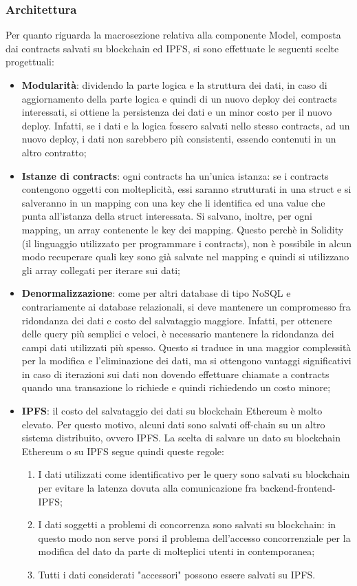 \subsubsection{Architettura}
		Per quanto riguarda la macrosezione relativa alla componente Model, composta dai contracts salvati su blockchain ed IPFS, si sono effettuate le seguenti scelte progettuali:
		\begin{itemize}
			\item \textbf{Modularità}: dividendo la parte logica e la struttura dei dati, in caso di aggiornamento della parte logica e quindi di un nuovo deploy dei contracts interessati, si ottiene la persistenza dei dati e un minor costo per il nuovo deploy. Infatti, se i dati e la logica fossero salvati nello stesso contracts, ad un nuovo deploy, i dati non sarebbero più consistenti, essendo contenuti in un altro contratto;
			\item \textbf{Istanze di contracts}: ogni contracts ha un'unica istanza: se i contracts contengono oggetti con molteplicità, essi saranno strutturati in una struct e si salveranno in un mapping con una key che li identifica ed una value che punta all'istanza della struct interessata. Si salvano, inoltre, per ogni mapping, un array contenente le key dei mapping. Questo perchè in Solidity (il linguaggio utilizzato per programmare i contracts), non è possibile in alcun modo recuperare quali key sono già salvate nel mapping e quindi si utilizzano gli array collegati per iterare sui dati;
			\item \textbf{Denormalizzazione}: come per altri database di tipo NoSQL e contrariamente ai database relazionali, si deve mantenere un compromesso fra ridondanza dei dati e costo del salvataggio maggiore. Infatti, per ottenere delle query più semplici e veloci, è necessario mantenere la ridondanza dei campi dati utilizzati più spesso. Questo si traduce in una maggior complessità per la modifica e l'eliminazione dei dati, ma si ottengono vantaggi significativi in caso di iterazioni sui dati non dovendo effettuare chiamate a contracts quando una transazione lo richiede e quindi richiedendo un costo minore;
			\item \textbf{IPFS}: il costo del salvataggio dei dati su blockchain Ethereum è molto elevato. Per questo motivo, alcuni dati sono salvati off-chain su un altro sistema distribuito, ovvero IPFS. La scelta di salvare un dato su blockchain Ethereum o su IPFS segue quindi queste regole:
			\begin{enumerate}
				\item I dati utilizzati come identificativo per le query sono salvati su blockchain
				per evitare la latenza dovuta alla comunicazione fra backend-frontend-IPFS;
				\item I dati soggetti a problemi di concorrenza sono salvati su blockchain: in questo modo
				non serve porsi il problema dell'accesso concorrenziale per la modifica del dato da parte
				di molteplici utenti in contemporanea;
				\item Tutti i dati considerati "accessori" possono essere salvati su IPFS.
			\end{enumerate}
		\end{itemize}
